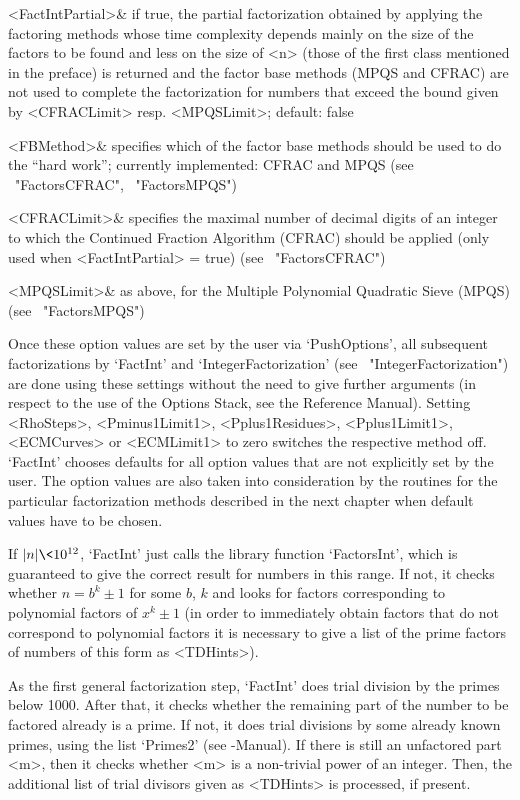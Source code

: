    <FactIntPartial>& if true, the partial factorization obtained
   by applying the factoring methods whose time complexity depends
   mainly on the size of the factors to be found and less
   on the size of <n> (those of the first class mentioned
   in the preface) is returned and the factor base methods
   (MPQS and CFRAC) are not used to complete the factorization
   for numbers that exceed the bound given by <CFRACLimit> 
   resp. <MPQSLimit>; default: false

   <FBMethod>& specifies which of the factor base methods should be
   used to do the ``hard work''; currently implemented: CFRAC and MPQS
   (see ~"FactorsCFRAC", ~"FactorsMPQS")

   <CFRACLimit>& specifies the maximal number of decimal digits of
   an integer to which the Continued Fraction Algorithm (CFRAC) 
   should be applied (only used when <FactIntPartial> = true)
   (see ~"FactorsCFRAC")

   <MPQSLimit>& as above, for the Multiple Polynomial Quadratic 
   Sieve (MPQS) (see ~"FactorsMPQS")
\enditems

Once these option values are set by the user via `PushOptions',
all subsequent factorizations
by `FactInt' and `IntegerFactorization' (see ~"IntegerFactorization")
are done using these settings without the need
to give further arguments (in respect to the use of the
{\GAP} Options Stack, see the Reference Manual).
Setting <RhoSteps>, <Pminus1Limit1>, <Pplus1Residues>, <Pplus1Limit1>,
<ECMCurves> or <ECMLimit1> to zero switches the respective method off.
`FactInt' chooses defaults for all option values that are 
not explicitly set by the user.
The option values are also taken into consideration by the routines for
the particular factorization methods described in the next chapter
when default values have to be chosen. 

If $|n| \< 10^{12}$, `FactInt' just calls the library function
`FactorsInt', which is guaranteed to give the correct result for
numbers in this range. If not, it checks whether $n = b^k \pm 1$ for 
some $b$, $k$ and looks for factors corresponding to
polynomial factors of $x^k \pm 1$ (in order to immediately 
obtain factors that do not correspond to polynomial factors  
it is necessary to give a list of the prime factors of numbers
of this form as <TDHints>).  

As the first general factorization step, `FactInt' does 
trial division by the primes below 1000. 
After that, it checks whether the remaining
part of the number to be factored already is a prime.
If not, it does trial divisions by some already known primes, using
the list `Primes2' (see {\GAP}-Manual).
If there is still an unfactored part <m>, then it checks whether <m>
is a non-trivial power of an integer.
Then, the additional list of trial divisors given
as <TDHints> is processed, if present.

